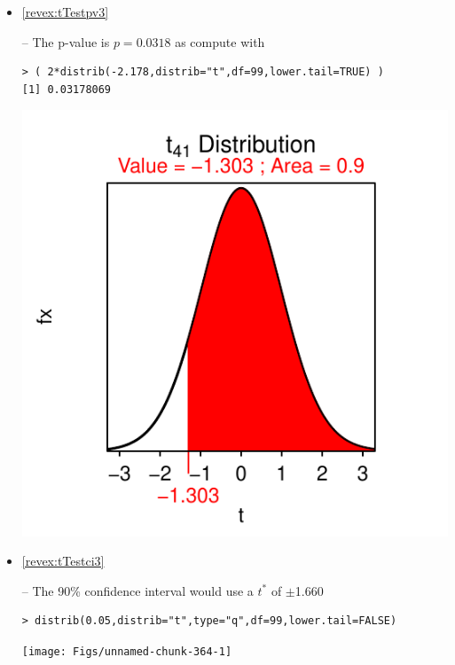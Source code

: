 \documentclass[10pt,openany]{book}\usepackage[]{graphicx}\usepackage[]{color}
\makeatletter
\newenvironment{kframe}{%
 \def\at@end@of@kframe{}%
 \ifinner\ifhmode%
  \def\at@end@of@kframe{\end{minipage}}%
  \begin{minipage}{\columnwidth}%
 \fi\fi%
 \def\FrameCommand##1{\hskip\@totalleftmargin \hskip-\fboxsep
 \colorbox{shadecolor}{##1}\hskip-\fboxsep
     \hskip-\linewidth \hskip-\@totalleftmargin \hskip\columnwidth}%
 \MakeFramed {\advance\hsize-\width
   \@totalleftmargin\z@ \linewidth\hsize
   \@setminipage}}%
 {\par\unskip\endMakeFramed%
 \at@end@of@kframe}
\newenvironment{knitrout}{}{} %
\makeatother
\begin{document}
\begin{itemize}
\begin{knitrout}
{}



\end{knitrout}
  \item \hypertarget{ans:tTestpv3}{\ref{revex:tTestpv3}} -- The p-value is $p=0.0318$ as compute with
\begin{knitrout}
\color{fgcolor}\begin{kframe}
\begin{verbatim}
> ( 2*distrib(-2.178,distrib="t",df=99,lower.tail=TRUE) )
[1] 0.03178069
\end{verbatim}
\end{kframe}

{\centering \includegraphics[width=.4\linewidth]{Figs/unnamed-chunk-363-1} 

}



\end{knitrout}
  \item \hypertarget{ans:tTestci3}{\ref{revex:tTestci3}} -- The 90\% confidence interval would use a $t^{*}$ of $\pm$1.660
\begin{knitrout}
\color{fgcolor}\begin{kframe}
\begin{verbatim}
> distrib(0.05,distrib="t",type="q",df=99,lower.tail=FALSE)
\end{verbatim}
\end{kframe}

{\centering \texttt{[image: Figs/unnamed-chunk-364-1]} 

}



\end{knitrout}


\end{itemize}
\end{document}
